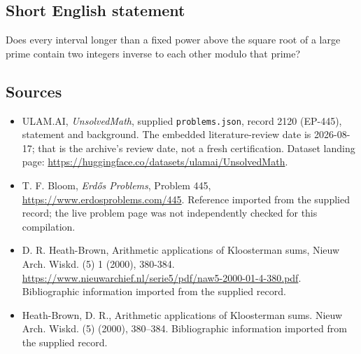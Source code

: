 \documentclass[11pt,a4paper]{article}
\begin{document}
\subsection{Short English statement}

Does every interval longer than a fixed power above the square root of a large prime contain two integers inverse to each other modulo that prime?

\subsection{Sources}

{\small

\begin{itemize}

\item[\hypertarget{source:2120:1}{S1}] ULAM.AI, \emph{UnsolvedMath}, supplied \texttt{problems.json}, record 2120 (EP-445), statement and background. The embedded literature-review date is 2026-08-17; that is the archive’s review date, not a fresh certification. Dataset landing page: \url{https://huggingface.co/datasets/ulamai/UnsolvedMath}.

\item[\hypertarget{source:2120:2}{S2}] T. F. Bloom, \emph{Erdős Problems}, Problem 445, \url{https://www.erdosproblems.com/445}. Reference imported from the supplied record; the live problem page was not independently checked for this compilation.

\item[\hypertarget{source:2120:3}{S3}] D. R. Heath-Brown, Arithmetic applications of Kloosterman sums, Nieuw Arch. Wiskd. (5) 1 (2000), 380-384. \url{https://www.nieuwarchief.nl/serie5/pdf/naw5-2000-01-4-380.pdf}. Bibliographic information imported from the supplied record.

\item[\hypertarget{source:2120:4}{S4}] Heath-Brown, D. R., Arithmetic applications of {K}loosterman sums. Nieuw Arch. Wiskd. (5) (2000), 380--384. Bibliographic information imported from the supplied record.

\end{itemize}

}

\label{end:2120}
\end{document}

